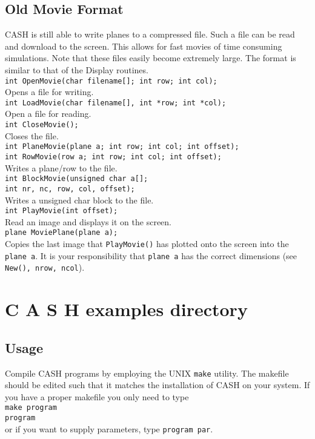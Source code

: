 \documentclass[12pt]{article}
\newcommand{\mtt}[1]{\texttt{\\#1\\}}
\begin{document}
\subsection{Old Movie Format}
CASH is still able to write planes to a compressed file.
Such a file can be read and download to the screen.
This allows for fast movies of time consuming simulations.
Note that these files easily become extremely large.
The format is similar to that of the Display routines.
\mtt{ int OpenMovie(char filename[]; int row; int col);}
Opens a file for writing.
\mtt{ int LoadMovie(char filename[], int *row; int *col);}
Open a file for reading.
\mtt{ int CloseMovie();}
Closes the file.
\mtt{ 
int PlaneMovie(plane a; int row; int col; int offset);\\
int RowMovie(row a; int row; int col; int offset);
}
Writes a plane/row to the file.
\mtt{ int BlockMovie(unsigned char a[];\\int nr, nc, row, col, offset);}
Writes a unsigned char block to the file.
\mtt{ int PlayMovie(int offset);}
Read an image and displays it on the screen.
\mtt{ plane MoviePlane(plane a);}
Copies the last image that {\tt  PlayMovie()} has plotted
onto the screen into the {\tt plane a}. It is your
responsibility that {\tt plane a} has the correct dimensions
(see {\tt New(), nrow, ncol}).

\section{C A S H  examples directory}
\subsection{Usage}
Compile CASH programs by employing the UNIX {\tt make} utility.
The makefile should be edited such that it matches the installation
of CASH on your system.
If you have a proper makefile you only need to type
\mtt{make program\\program}
or if you want to supply parameters, type {\tt program par}.
\end{document}

